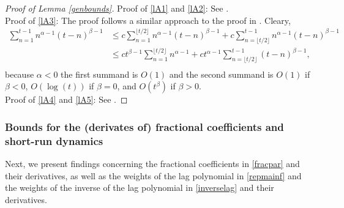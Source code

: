 {{\begin{lemma}
\end{lemma}
\begin{proof}[Proof of Lemma \ref{genbounds}] Proof of \eqref{lA1} and \eqref{lA2}: See \textcite[Lemma A.1]{johansen2016role}. \\
Proof of \eqref{lA3}: The proof follows a similar approach to the proof in \textcite[Lemma 1]{hualde2011gaussian}.
Cleary,
\begin{align*}
    \sum_{n = 1}^{t-1} n^{\alpha-1} (t-n)^{\beta - 1} &\leq  c \sum_{n = 1}^{\lfloor t/2 \rfloor} n^{\alpha-1} (t-n)^{\beta - 1} +  c \sum_{n = \lfloor t/2 \rfloor}^{t-1} n^{\alpha-1} (t-n)^{\beta - 1} \\
    &\leq c t^{\beta - 1} \sum_{n = 1}^{\lfloor t/2 \rfloor} n^{\alpha-1} +  c t^{\alpha-1} \sum_{n = \lfloor t/2 \rfloor}^{t-1} (t-n)^{\beta - 1}, \\
\end{align*}
because $\alpha < 0$ the first summand is $O(1)$ and the second summand is $O(1)$ if $\beta < 0$, $O(\log(t))$ if $\beta = 0$, and $O(t^\beta)$ if $\beta > 0$. \\
Proof of \eqref{lA4} and \eqref{lA5}: See \textcite[Lemma A.5]{johansen2016role}.

\end{proof}


\subsubsection{Bounds for the (derivates of) fractional coefficients and short-run dynamics} \label{UB1}

Next, we present findings concerning the fractional coefficients in \eqref{fracpar} and their derivatives, as well as the weights of the lag polynomial in \eqref{repmainf} and the weights of the inverse of the lag polynomial in \eqref{inverselag} and their derivatives.

}}
